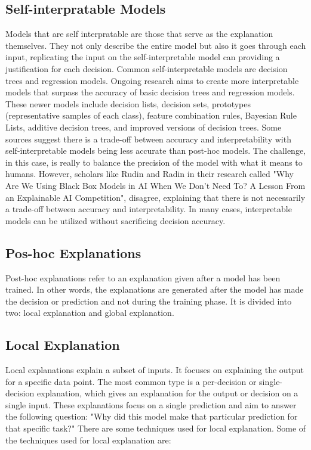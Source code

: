 \documentclass[10pt,journal,compsoc]{IEEEtran}
\begin{document}
\subsection{Self-interpratable Models}
Models that are self interpratable are those that serve as the explanation themselves. They not only describe the entire model but also it goes through each input, replicating the input on the self-interpretable model can providing a justification for each decision.
Common self-interpretable models are decision trees and regression models. Ongoing research aims to create more interpretable models that surpass the accuracy of basic decision trees and regression models. These newer models include decision lists, decision sets, prototypes (representative samples of each class), feature combination rules, Bayesian Rule Lists, additive decision trees, and improved versions of decision trees.\cite{phillips2020four}
Some sources suggest there is a trade-off between accuracy and interpretability with self-interpretable models being less accurate than post-hoc models. The challenge, in this case, is really to balance the precision of the model with what it means to humans. However, scholars like Rudin\cite{rudin} and Radin\cite{radin} in their research called "Why Are We Using Black Box Models in AI When We Don’t Need To? A Lesson From an Explainable AI Competition", disagree, explaining that there is not necessarily a trade-off between accuracy and interpretability. In many cases, interpretable models can be utilized without sacrificing decision accuracy.\cite{phillips2020four}

\subsection{Pos-hoc Explanations}
Post-hoc explanations refer to an explanation given after a model has been trained. In other words, the explanations are generated after the model has made the decision or prediction and not during the training phase. It is divided into two: local explanation and global explanation.

\subsection{Local Explanation} Local explanations explain a subset of inputs. It focuses on explaining the output for a specific data point. The most common type is a per-decision or single-decision explanation, which gives an explanation for the output or decision on a single input.\cite{phillips2020four}
These explanations focus on a single prediction and aim to answer the following question: "Why did this model make that particular prediction for that specific task?" There are some techniques used for local explanation. Some of the techniques used for local explanation are:
\end{document}
